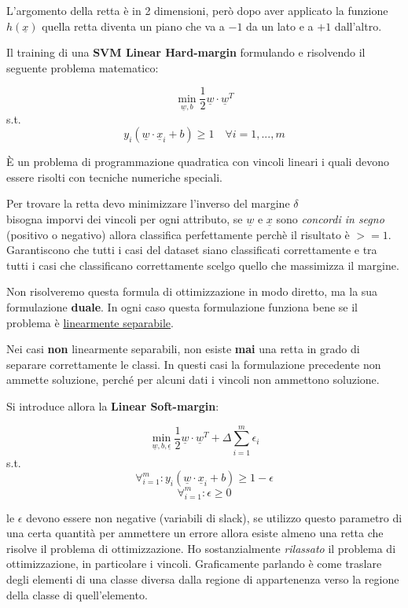 L'argomento della retta \`e in 2 dimensioni, per\`o dopo aver applicato la funzione $h(\underline{x})$ quella retta diventa un piano che va a $-1$ da un lato e a $+1$ dall'altro.

Il training di una \textbf{SVM Linear Hard-margin} formulando e risolvendo il seguente problema matematico: 

\[ \min_{\underline{w},b} \frac{1}{2}\underline{w} \cdot \underline{w}^T \]
\qquad s.t.
\[ y_i (\underline{w} \cdot \underline{x}_i + b) \ge 1 \quad \forall i = 1, ..., m\]

È un problema di programmazione quadratica con vincoli lineari i quali devono essere risolti con tecniche numeriche speciali.

Per trovare la retta devo minimizzare l'inverso del margine $\delta$\\
bisogna imporvi dei vincoli per ogni attributo, se $\underline{w}$ e $\underline{x}$ sono \textit{concordi in segno} (positivo o negativo) allora classifica perfettamente perch\`e il risultato è $>= 1$. Garantiscono che tutti i casi del dataset siano classificati correttamente e tra tutti i casi che classificano correttamente scelgo quello che massimizza il margine. 

Non risolveremo questa formula di ottimizzazione in modo diretto, ma la sua formulazione \textbf{duale}. In ogni caso questa formulazione funziona bene se il problema \`e \underline{linearmente separabile}.

Nei casi \textbf{non} linearmente separabili, non esiste \textbf{mai} una retta in grado di separare correttamente le classi. In questi casi la formulazione precedente non ammette soluzione, perch\'e per alcuni dati i vincoli non ammettono soluzione. 

Si introduce allora la \textbf{Linear Soft-margin}:

\[ \min_{\underline{w},b,\underline{\epsilon}} \frac{1}{2}\underline{w} \cdot \underline{w}^T + \Delta \sum_{i=1}^{m} \epsilon_i \]
\qquad s.t.
\[\forall_{i=1}^m :  y_i (\underline{w} \cdot \underline{x}_i + b) \ge 1 - \epsilon \] \[\forall_{i=1}^m : \epsilon \ge 0\]

le $\epsilon$ devono essere non negative (variabili di slack), se utilizzo questo parametro di una certa quantit\`a per ammettere un errore allora esiste almeno una retta che risolve il problema di ottimizzazione. Ho sostanzialmente \textit{rilassato} il problema di ottimizzazione, in particolare i vincoli. Graficamente parlando \`e come traslare degli elementi di una classe diversa dalla regione di appartenenza verso la regione della classe di quell'elemento.


